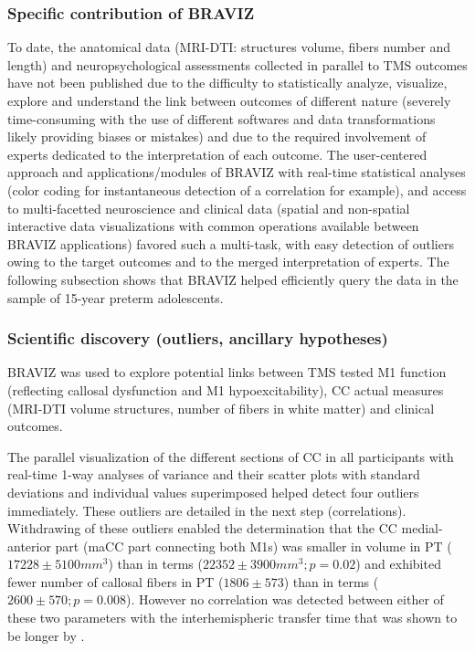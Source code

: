 \documentclass{frontiersHLTH}
\begin{document}
\subsubsection{Specific contribution of BRAVIZ}

To date, the anatomical data (MRI-DTI: structures volume, fibers number and length) and neuropsychological assessments collected in parallel to TMS outcomes have not been published due to the difficulty to statistically analyze, visualize, explore and understand the link between outcomes of different nature (severely time-consuming with the use of different softwares and data transformations likely providing biases or mistakes) and due to the required involvement of experts dedicated to the interpretation of each outcome. The user-centered approach and applications/modules of BRAVIZ with real-time statistical analyses (color coding for instantaneous detection of a correlation for example), and access to multi-facetted neuroscience and clinical data (spatial and non-spatial interactive data visualizations with common operations available between BRAVIZ applications) favored such a multi-task, with easy detection of outliers owing to the target outcomes and to the merged interpretation of experts. The following subsection shows that BRAVIZ helped efficiently query the data in the sample of 15-year preterm adolescents.

\subsubsection{Scientific discovery (outliers, ancillary hypotheses)}

BRAVIZ was used to explore potential links between TMS tested M1 function (reflecting callosal dysfunction and M1 hypoexcitability), CC actual measures (MRI-DTI volume structures, number of fibers in white matter) and clinical outcomes. 

The parallel visualization of the different sections of CC in all participants with real-time 1-way analyses of variance and their scatter plots with standard deviations and individual values superimposed helped detect four outliers immediately. These outliers are detailed in the next step (correlations). Withdrawing of these outliers enabled the determination that the CC medial-anterior part (maCC part connecting both M1s) was smaller in volume in PT ($17228 \pm 5100 mm^3$) than in terms ($22352 \pm 3900 mm^3; p=0.02$) and exhibited fewer number of callosal fibers in PT ($1806 \pm 573$) than in terms ($2600 \pm 570; p=0.008$). However no correlation was detected between either of these two parameters with the interhemispheric transfer time that was shown to be longer by \cite{schneider_cerebral_2012}. 
\end{document}
